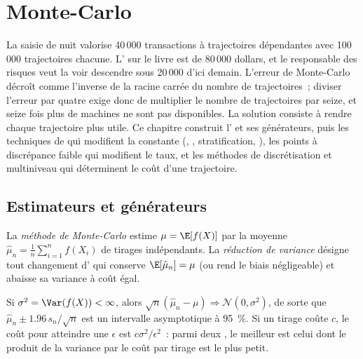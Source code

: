 \chapter{Monte-Carlo}\label{ch:qm:monte-carlo}

La saisie de nuit valorise 40\,000 transactions à trajectoires dépendantes avec 100\,000 trajectoires chacune. L' sur le livre est de 80\,000 dollars, et le responsable des risques veut la voir descendre sous 20\,000 d'ici demain.
L'erreur de Monte-Carlo décroît comme l'inverse de la racine carrée du nombre de trajectoires~; diviser l'erreur par quatre exige donc de multiplier le nombre de trajectoires par seize, et seize fois plus de machines ne sont pas disponibles. La
solution consiste à rendre chaque trajectoire plus utile. Ce chapitre construit l' et ses générateurs, puis les techniques de  qui modifient la constante (,
, stratification, ), les points à discrépance faible qui modifient le taux, et les méthodes de discrétisation et multiniveau qui déterminent le coût d'une trajectoire.

\section{Estimateurs et générateurs}

\begin{definition}\label{def:qm:monte-carlo:mc}
La \emph{méthode de Monte-Carlo} estime $\mu = \E[f(X)]$ par la moyenne $\hat\mu_n = \frac1n\sum_{i=1}^nf(X_i)$ de tirages indépendants. La \emph{réduction de
variance} désigne tout changement d' qui conserve $\E[\hat\mu_n] = \mu$ (ou rend le biais négligeable) et abaisse sa variance à coût égal.
\end{definition}

\begin{proposition}\label{prop:qm:monte-carlo:clt}
Si $\sigma^2 = \Var(f(X)) < \infty$, alors $\sqrt n(\hat\mu_n - \mu) \Rightarrow \mathcal N(0, \sigma^2)$, de sorte que $\hat\mu_n \pm 1.96\,s_n/\sqrt n$ est un intervalle asymptotique à 95~\%. Si un tirage coûte $c$, le
coût pour atteindre une  $\epsilon$ est $c\sigma^2/\epsilon^2$~: parmi deux , le meilleur est celui dont le produit de la variance par le coût par tirage est le plus petit.
\end{proposition}

